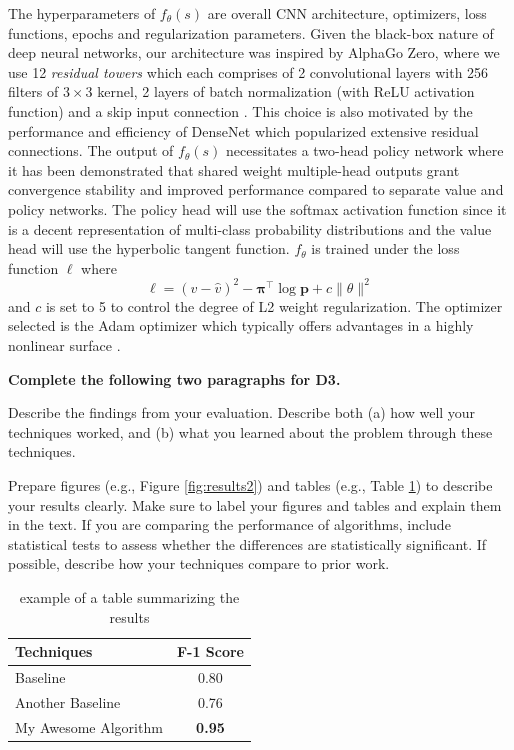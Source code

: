 \documentclass[letterpaper]{article} %
\begin{document}
The hyperparameters of $f_\theta(s)$ are overall CNN architecture, optimizers, loss functions, epochs and regularization parameters. Given the black-box nature of deep neural networks, our architecture was inspired by AlphaGo Zero, where we use 12 \textit{residual towers} which each comprises of 2 convolutional layers with 256 filters of $3 \times 3$ kernel, 2 layers of batch normalization (with ReLU activation function) and a skip input connection \cite{alphago2016}. This choice is also motivated by the performance and efficiency of DenseNet \cite{huang2017densely} which popularized extensive residual connections. The output of $f_\theta(s)$ necessitates a two-head policy network where it has been demonstrated that shared weight multiple-head outputs grant convergence stability and improved performance \cite{alphago2016} compared to separate value and policy networks. The policy head will use the softmax activation function since it is a decent representation of multi-class probability distributions and the value head will use the hyperbolic tangent function. $f_\theta$ is trained under the loss function $\ell$ where
$$\ell = (v - \hat{v})^2 -\bm\pi^\top \log \bm{p} + c\|\theta\|^2$$
and $c$ is set to 5 to control the degree of L2 weight regularization. The optimizer selected is the Adam optimizer which typically offers advantages in a highly nonlinear surface \cite{alphago2016}.

{\bf Complete the following two paragraphs for D3.}

Describe the findings from your evaluation.  Describe both (a) how well your techniques worked, and (b) what you learned about the problem through these techniques.  

Prepare figures (e.g., Figure \ref{fig:results2}) and tables (e.g., Table \ref{tab:results1}) to describe your results clearly.  Make sure to label your figures and tables and explain them in the text.  If you are comparing the performance of algorithms, include statistical tests to assess whether the differences are statistically significant.  If possible, describe how your techniques compare to prior work.  

\begin{table}[h!]
    \centering
    \normalsize{
    \begin{tabular}{ l c }
    \hline
         Techniques & F-1 Score\\
         \hline
          Baseline & 0.80 \\
          Another Baseline & 0.76\\
          My Awesome Algorithm & {\bf 0.95}\\
         \hline
    \end{tabular}}
    \caption{example of a table summarizing the results}
    \label{tab:results1}
\end{table} 
\end{document}
